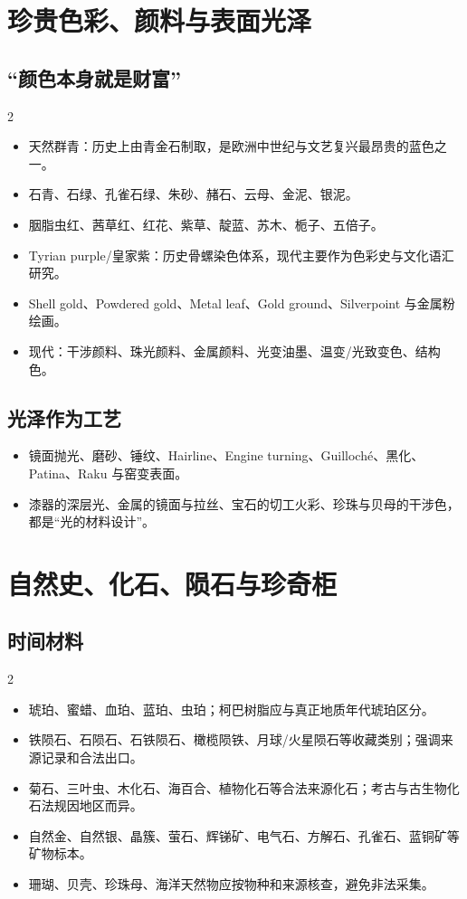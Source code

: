 \documentclass[lang=en,a4paper,11pt]{elegantpaper}
\begin{document}
\section{珍贵色彩、颜料与表面光泽}
\subsection{“颜色本身就是财富”}
\begin{multicols}{2}\begin{itemize}
\item 天然群青：历史上由青金石制取，是欧洲中世纪与文艺复兴最昂贵的蓝色之一。
\item 石青、石绿、孔雀石绿、朱砂、赭石、云母、金泥、银泥。
\item 胭脂虫红、茜草红、红花、紫草、靛蓝、苏木、栀子、五倍子。
\item Tyrian purple/皇家紫：历史骨螺染色体系，现代主要作为色彩史与文化语汇研究。
\item Shell gold、Powdered gold、Metal leaf、Gold ground、Silverpoint 与金属粉绘画。
\item 现代：干涉颜料、珠光颜料、金属颜料、光变油墨、温变/光致变色、结构色。
\end{itemize}\end{multicols}
\subsection{光泽作为工艺}
\begin{itemize}
\item 镜面抛光、磨砂、锤纹、Hairline、Engine turning、Guilloché、黑化、Patina、Raku 与窑变表面。
\item 漆器的深层光、金属的镜面与拉丝、宝石的切工火彩、珍珠与贝母的干涉色，都是“光的材料设计”。
\end{itemize}

\section{自然史、化石、陨石与珍奇柜}
\subsection{时间材料}
\begin{multicols}{2}\begin{itemize}
\item 琥珀、蜜蜡、血珀、蓝珀、虫珀；柯巴树脂应与真正地质年代琥珀区分。
\item 铁陨石、石陨石、石铁陨石、橄榄陨铁、月球/火星陨石等收藏类别；强调来源记录和合法出口。
\item 菊石、三叶虫、木化石、海百合、植物化石等合法来源化石；考古与古生物化石法规因地区而异。
\item 自然金、自然银、晶簇、萤石、辉锑矿、电气石、方解石、孔雀石、蓝铜矿等矿物标本。
\item 珊瑚、贝壳、珍珠母、海洋天然物应按物种和来源核查，避免非法采集。
\end{itemize}\end{multicols}
\end{document}
